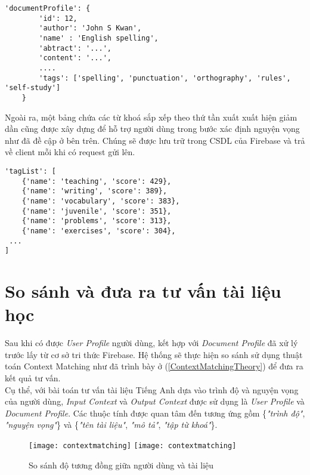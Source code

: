 \begin{lstlisting}[style=pythoncode, breaklines = true]
'documentProfile': {
        'id': 12,
        'author': 'John S Kwan',
        'name' : 'English spelling',
        'abtract': '...',
        'content': '...',
        ....
        'tags': ['spelling', 'punctuation', 'orthography', 'rules', 'self-study']
    }
\end{lstlisting}

Ngoài ra, một bảng chứa các từ khoá sắp xếp theo thứ tần xuất xuất hiện giảm dần cũng được xây dựng để hỗ trợ người dùng trong bước xác định nguyện vọng như đã đề cập ở bên trên. Chúng sẽ được lưu trữ trong CSDL của Firebase và trả về client mỗi khi có request gửi lên.

\begin{lstlisting}[style=pythoncode, breaklines = true, label = PopularValue]
'tagList': [
	{'name': 'teaching', 'score': 429},
	{'name': 'writing', 'score': 389},
	{'name': 'vocabulary', 'score': 383},
	{'name': 'juvenile', 'score': 351},
	{'name': 'problems', 'score': 313},
	{'name': 'exercises', 'score': 304},
 ...
]
\end{lstlisting}

\section{So sánh và đưa ra tư vấn tài liệu học }

Sau khi có được \textit{User Profile} người dùng, kết hợp với \textit{Document Profile} đã xử lý trước lấy từ cơ sở tri thức Firebase. Hệ thống sẽ thực hiện so sánh sử dụng thuật toán Context Matching như đã trình bày ở (\ref{ContextMatchingTheory}) để đưa ra kết quả tư vấn. \\

Cụ thể, với bài toán tư vấn tài liệu Tiếng Anh dựa vào trình độ và nguyện vọng của người dùng, \textit{Input Context} và \textit{Output Context} được sử dụng là \textit{User Profile} và \textit{Document Profile}. Các thuộc tính được quan tâm đến tương ứng gồm \{\textit{"trình độ"}, \textit{"nguyện vọng"}\} và \{\textit{"tên tài liệu"}, \textit{"mô tả"}, \textit{"tập từ khoá"}\}.

\begin{figure}[H]
  \begin{center}
    \ifpdf
      \texttt{[image: contextmatching]}
    \else
      \texttt{[image: contextmatching]}
    \fi
    \caption{So sánh độ tương đồng giữa người dùng và tài liệu}
    \label{ContextMatchingModel}
  \end{center}
\end{figure}

